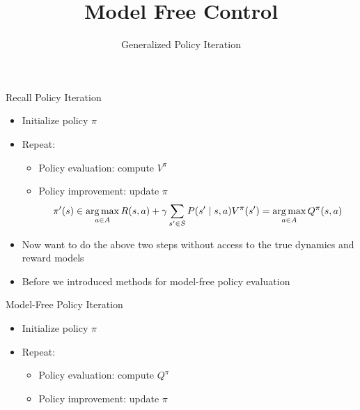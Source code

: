 \documentclass[aspectratio=169]{../latex_main/tntbeamer}  %
\title[RL: Model Free Control]{Model Free Control}
\subtitle{Generalized Policy Iteration}
\begin{document}
	
	\maketitle

\begin{frame}[c]{Recall Policy Iteration}

\begin{itemize}
	\item Initialize policy $\pi$
	\item Repeat:
	\begin{itemize}
		\item Policy evaluation: compute $V^\pi$
		\item Policy improvement: update $\pi$
	$$\pi'(s) \in \operatorname*{arg\,max}_{a \in A} R(s,a) + \gamma \sum_{s' \in S} P(s' \mid s,a) V^\pi (s') = \operatorname*{arg\,max}_{a \in A} Q^\pi (s,a) $$
	\end{itemize}
	\item Now want to do the above two steps \alert{without} access to the true dynamics and reward models
	\item Before we introduced methods for model-free policy evaluation
\end{itemize}

\end{frame}
\begin{frame}[c]{Model-Free Policy Iteration}
	
	\begin{itemize}
		\item Initialize policy $\pi$
		\item Repeat:
		\begin{itemize}
			\item Policy evaluation: compute $Q^\pi$
			\item Policy improvement: update $\pi$
		\end{itemize}
	\end{itemize}
	
\end{frame}
\end{document}

